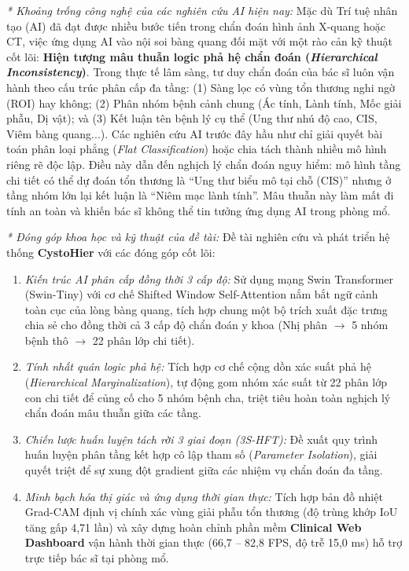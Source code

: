 \documentclass[a4paper]{article}
\begin{document}
\textit{* Khoảng trống công nghệ của các nghiên cứu AI hiện nay:}
Mặc dù Trí tuệ nhân tạo (AI) đã đạt được nhiều bước tiến trong chẩn đoán hình ảnh X-quang hoặc CT, việc ứng dụng AI vào nội soi bàng quang đối mặt với một rào cản kỹ thuật cốt lõi: \textbf{Hiện tượng mâu thuẫn logic phả hệ chẩn đoán (\textit{Hierarchical Inconsistency})}.
Trong thực tế lâm sàng, tư duy chẩn đoán của bác sĩ luôn vận hành theo cấu trúc phân cấp đa tầng: (1) Sàng lọc có vùng tổn thương nghi ngờ (ROI) hay không; (2) Phân nhóm bệnh cảnh chung (Ác tính, Lành tính, Mốc giải phẫu, Dị vật); và (3) Kết luận tên bệnh lý cụ thể (Ung thư nhú độ cao, CIS, Viêm bàng quang...). Các nghiên cứu AI trước đây hầu như chỉ giải quyết bài toán phân loại phẳng (\textit{Flat Classification}) hoặc chia tách thành nhiều mô hình riêng rẽ độc lập. Điều này dẫn đến nghịch lý chẩn đoán nguy hiểm: mô hình tầng chi tiết có thể dự đoán tổn thương là ``Ung thư biểu mô tại chỗ (CIS)'' nhưng ở tầng nhóm lớn lại kết luận là ``Niêm mạc lành tính''. Mâu thuẫn này làm mất đi tính an toàn và khiến bác sĩ không thể tin tưởng ứng dụng AI trong phòng mổ.

\textit{* Đóng góp khoa học và kỹ thuật của đề tài:}
Đề tài nghiên cứu và phát triển hệ thống \textbf{CystoHier} với các đóng góp cốt lõi:
\begin{enumerate}
  \item \textit{Kiến trúc AI phân cấp đồng thời 3 cấp độ:} Sử dụng mạng Swin Transformer (Swin-Tiny) với cơ chế Shifted Window Self-Attention nắm bắt ngữ cảnh toàn cục của lòng bàng quang, tích hợp chung một bộ trích xuất đặc trưng chia sẻ cho đồng thời cả 3 cấp độ chẩn đoán y khoa (Nhị phân $\rightarrow$ 5 nhóm bệnh thô $\rightarrow$ 22 phân lớp chi tiết).
  \item \textit{Tính nhất quán logic phả hệ:} Tích hợp cơ chế cộng dồn xác suất phả hệ (\textit{Hierarchical Marginalization}), tự động gom nhóm xác suất từ 22 phân lớp con chi tiết để củng cố cho 5 nhóm bệnh cha, triệt tiêu hoàn toàn nghịch lý chẩn đoán mâu thuẫn giữa các tầng.
  \item \textit{Chiến lược huấn luyện tách rời 3 giai đoạn (3S-HFT):} Đề xuất quy trình huấn luyện phân tầng kết hợp cô lập tham số (\textit{Parameter Isolation}), giải quyết triệt để sự xung đột gradient giữa các nhiệm vụ chẩn đoán đa tầng.
  \item \textit{Minh bạch hóa thị giác và ứng dụng thời gian thực:} Tích hợp bản đồ nhiệt Grad-CAM định vị chính xác vùng giải phẫu tổn thương (độ trùng khớp IoU tăng gấp 4,71 lần) và xây dựng hoàn chỉnh phần mềm \textbf{Clinical Web Dashboard} vận hành thời gian thực (66,7 -- 82,8 FPS, độ trễ 15,0 ms) hỗ trợ trực tiếp bác sĩ tại phòng mổ.
\end{enumerate}
\end{document}
